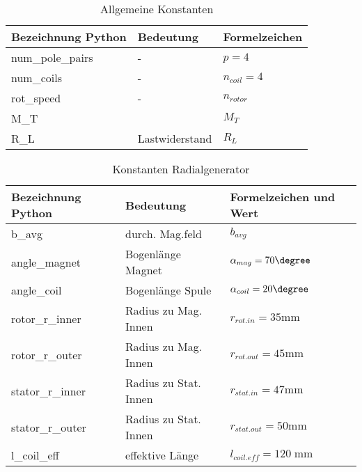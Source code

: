 \begin{table}[h!]

\centering
\caption{Allgemeine Konstanten}
\renewcommand{\arraystretch}{2}
\setlength{\tabcolsep}{7mm}

\begin{tabular}{lll}
    \toprule
     Bezeichnung Python & Bedeutung & Formelzeichen\\
    \midrule
	num\_pole\_pairs &-&$p = 4$\\
	num\_coils &-&$n_{coil} = 4$\\
	rot\_speed &-&$n_{rotor}$\\
	M\_T &&$M_{T}$\\
	R\_L &Lastwiderstand&$R_L$\\

    \bottomrule
  \end{tabular}
\end{table}

\newpage


\begin{table}[h!]

\centering
\caption{Konstanten Radialgenerator}
\renewcommand{\arraystretch}{2}
\setlength{\tabcolsep}{5mm}

\begin{tabular}{lll}
    \toprule
     Bezeichnung Python & Bedeutung & Formelzeichen und Wert\\
    \midrule
    b\_avg &durch. Mag.feld &$b_{avg}$\\
	angle\_magnet &Bogenlänge Magnet&$\alpha_ {mag}=70\degree$\\
	angle\_coil &Bogenlänge Spule&$\alpha_{coil} = 20\degree$\\
	rotor\_r\_inner &Radius zu Mag. Innen&$r_{rot.in} = 35 \text{mm}$\\
	rotor\_r\_outer &Radius zu Mag. Innen&$r_{rot.out} = 45 \text{mm}$\\
	stator\_r\_inner &Radius zu Stat. Innen&$r_{stat.in} = 47 \text{mm}$\\
	stator\_r\_outer &Radius zu Stat. Innen&$r_{stat.out} = 50 \text{mm}$\\
  l\_coil\_eff &effektive Länge&$l_{coil.eff} = 120 \; \text{mm} $\\


    \bottomrule
  \end{tabular}
\end{table}


